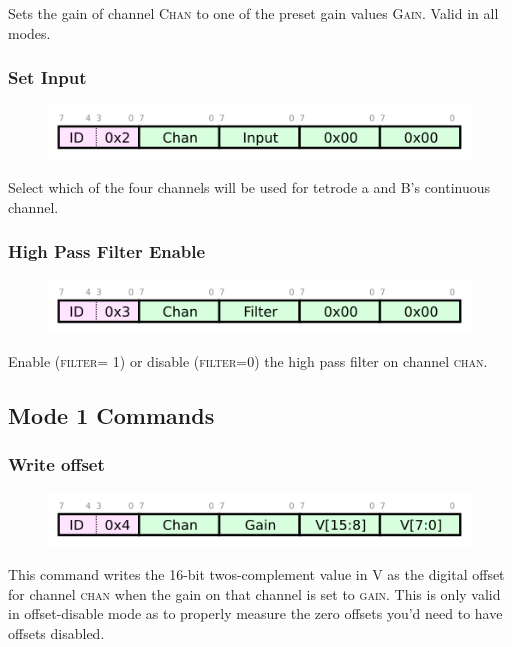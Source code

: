 Sets the gain of channel \textsc{Chan} to one of the preset gain values \textsc{Gain}. Valid in all modes. 

\subsubsection{Set Input}
\begin{figure}[h!]
\includegraphics[scale=1.0]{setinput.cmd.svg}
\end{figure}

Select which of the four channels will be used for tetrode a and B's continuous channel. 

\subsubsection{High Pass Filter Enable}
\begin{figure}[h!]
\includegraphics[scale=1.0]{setfilter.cmd.svg}
\end{figure}

Enable (\textsc{filter}= 1) or disable (\textsc{filter}=0) the high pass filter on channel \textsc{chan}. 


\subsection{Mode 1 Commands}
\subsubsection{Write offset}
\begin{figure}[h!]
\includegraphics[scale=1.0]{writeos.cmd.svg}
\end{figure}

This command writes the 16-bit twos-complement value in V as the
digital offset for channel \textsc{chan} when the gain on that channel
is set to \textsc{gain}. This is only valid in offset-disable mode as
to properly measure the zero offsets you'd need to have offsets
disabled.


